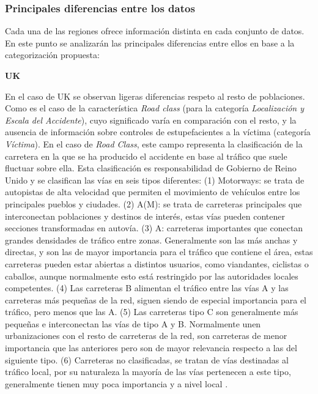 \subsubsection*{Principales diferencias entre los datos}

Cada una de las regiones ofrece información distinta en cada conjunto de datos. En este punto se analizarán las principales diferencias entre ellos en base a la categorización propuesta:

\textbf{UK}

En el caso de UK se observan ligeras diferencias respeto al resto de poblaciones. Como es el caso de la característica \textit{Road class} (para la categoría \textit{Localización y Escala del Accidente}), cuyo significado varía en comparación con el resto, y la ausencia de información sobre controles de estupefacientes a la víctima (categoría \textit{Víctima}). En el caso de \textit{Road Class}, este campo representa la clasificación de la carretera en la que se ha producido el accidente en base al tráfico que suele fluctuar sobre ella. Esta clasificación es responsabilidad de Gobierno de Reino Unido y se clasifican las vías en seis tipos diferentes: (1) Motorways: se trata de autopistas de alta velocidad que permiten el movimiento de vehículos entre los principales pueblos y ciudades. (2) A(M): se trata de carreteras principales que interconectan poblaciones y destinos de interés, estas vías pueden contener secciones transformadas en autovía. (3) A: carreteras importantes que conectan grandes densidades de tráfico entre zonas. Generalmente son las más anchas y directas, y son las de mayor importancia para el tráfico que contiene el área, estas carreteras pueden estar abiertas a distintos usuarios, como viandantes, ciclistas o caballos, aunque normalmente esto está restringido por las autoridades locales competentes. (4) Las carreteras B alimentan el tráfico entre las vías A y las carreteras más pequeñas de la red, siguen siendo de especial importancia para el tráfico, pero menos que las A. (5) Las carreteras tipo C son generalmente más pequeñas e interconectan las vías de tipo A y B. Normalmente unen urbanizaciones con el resto de carreteras de la red, son carreteras de menor importancia que las anteriores pero son de mayor relevancia respecto a las del siguiente tipo. (6) Carreteras no clasificadas, se tratan de vías destinadas al tráfico local, por su naturaleza la mayoría de las vías pertenecen a este tipo, generalmente tienen muy poca importancia y a nivel local \cite{UKDepartmentForTransportRoadClassification}.


